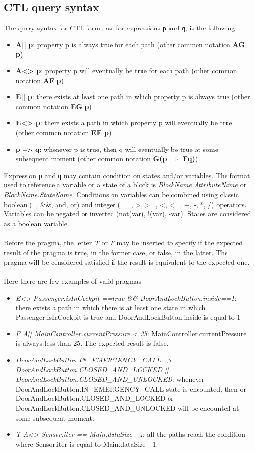 \documentclass[12pt]{article}
\begin{document}
\subsection{CTL query syntax}
The query syntax for CTL formulas, for expressions \texttt{p} and \texttt{q}, is the following:
\begin{itemize}
	\item \textbf{A[] p}: property p is always true for each path (other common notation \textbf{AG p})
	\item \textbf{A<> p}: property p will eventually be true for each path (other common notation \textbf{AF p})
	\item \textbf{E[] p}: there exists at least one path in which property p is always true (other common notation \textbf{EG p})
	\item \textbf{E<> p}:  there exists a path in which property p will eventually be true (other common notation \textbf{EF p})
	\item \textbf{p --> q}: whenever p is true, then q will eventually be true at some subsequent moment (other common notation \textbf{G(p $\Rightarrow$ Fq)})
\end{itemize}
Expression \texttt{p} and \texttt{q} may contain condition on states and/or variables. The format used to reference a variable or a state of a block is \textit{BlockName.AttributeName} or \textit{BlockName.StateName}. Conditions on variables can be combined using classic boolean (||, \&\&, and, or) and integer (==, >, >=, <, <=, +, -, *, /) operators. Variables can be negated or inverted (not(var), !(var), -var). States are considered as a boolean variable.
\\\\
Before the pragma, the letter \textit{T} or \textit{F} may be inserted to specify if the expected result of the pragma is true, in the former case, or false, in the latter. The pragma will be considered satisfied if the result is equivalent to the expected one.
\\\\
Here there are few examples of valid pragmas:
\begin{itemize}
	\item \textit{E<> Passenger.isInCockpit ==true \&\& DoorAndLockButton.inside==1}: there exists a path in which there is at least one state in which Passenger.isInCockpit is true and DoorAndLockButton.inside is equal to 1
	\item \textit{F A[] MainController.currentPressure < 25}: MainController.currentPressure is always less than 25. The expected result is false.
	\item \textit{DoorAndLockButton.IN\_EMERGENCY\_CALL --> DoorAndLockButton.CLOSED\_AND\_LOCKED || DoorAndLockButton.CLOSED\_AND\_UNLOCKED}: whenever DoorAndLockButton.IN\_EMERGENCY\_CALL state is encounted, then or DoorAndLockButton.CLOSED\_AND\_LOCKED or DoorAndLockButton.CLOSED\_AND\_UNLOCKED will be encounted at some subsequent moment.
	\item \textit{T A<> Sensor.iter == Main.dataSize - 1}: all the paths reach the condition where Sensor.iter is equal to Main.dataSize - 1.
\end{itemize}
\end{document}
